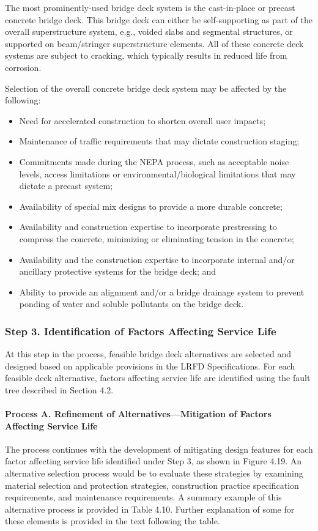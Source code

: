 The most prominently-used bridge deck system is the cast-in-place or precast concrete bridge deck. This bridge
deck can either be self-supporting as part of the overall superstructure system, e.g., voided slabs and segmental
structures, or supported on beam/stringer superstructure elements. All of these concrete deck systems are subject to
cracking, which typically results in reduced life from corrosion.

Selection of the overall concrete bridge deck system may be affected by the following:

\begin{itemize}
  \item Need for accelerated construction to shorten overall user impacts;
  \item Maintenance of traffic requirements that may dictate construction staging;
  \item Commitments made during the NEPA process, such as acceptable noise levels, access limitations or
  environmental/biological limitations that may dictate a precast system;
  \item Availability of special mix designs to provide a more durable concrete;
  \item Availability and construction expertise to incorporate prestressing to compress the concrete, minimizing or
  eliminating tension in the concrete;
  \item Availability and the construction expertise to incorporate internal and/or ancillary protective systems for the
  bridge deck; and
  \item Ability to provide an alignment and/or a bridge drainage system to prevent ponding of water and soluble
  pollutants on the bridge deck.
\end{itemize}

\subsubsection*{Step 3. Identification of Factors Affecting Service Life}
At this step in the process, feasible bridge deck alternatives are selected and designed based on applicable
provisions in the LRFD Specifications. For each feasible deck alternative, factors affecting service life are identified
using the fault tree described in Section 4.2.

\paragraph*{Process A. Refinement of Alternatives—Mitigation of Factors Affecting Service Life}
The process continues with the development of mitigating design features for each factor affecting service life
identified under Step 3, as shown in Figure 4.19. An alternative selection process would be to evaluate these
strategies by examining material selection and protection strategies, construction practice specification requirements,
and maintenance requirements. A summary example of this alternative process is provided in Table 4.10. Further
explanation of some for these elements is provided in the text following the table.

